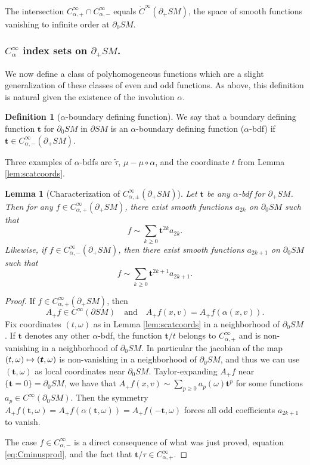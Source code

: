 \documentclass[11pt]{article}
\def\mto{\mathchoice{\longmapsto}{\mapsto}{\mapsto}{\mapsto}}
\theoremstyle{plain}
\newtheorem{Lemma}[Theorem]{Lemma}
\theoremstyle{definition}
\newtheorem{Definition}[Theorem]{Definition}
\theoremstyle{remark}
\def\t{\tilde{\tau}}
\newcommand{\bt}{{\boldsymbol{t}}}
\newcommand{\del}{\partial}
\begin{document}
The intersection $C_{\alpha,+}^\infty\cap C_{\alpha,-}^\infty$ equals $\dot C^\infty(\partial_+ SM)$, the space of
smooth functions vanishing to infinite order at $\partial_0 SM$.

\subsubsection*{$C_\alpha^\infty$ index sets on $\partial_+ SM$.} We now define a class of polyhomogeneous functions which are a slight generalization of these classes of even and odd functions. As above, this definition is natural given the existence of the involution $\alpha$.

\begin{Definition}[$\alpha$-boundary defining function]
We say that a boundary defining function $\bt$ for $\del_0 SM$ in $\del SM$ is an $\alpha$-boundary defining function ($\alpha$-bdf) if $\bt\in C_{\alpha,-}^\infty(\del_+ SM)$.
\end{Definition}
Three examples of $\alpha$-bdfs are $\t$, $\mu - \mu \circ \alpha$, and the coordinate $t$ from Lemma \ref{lem:scatcoords}.

\begin{Lemma}[Characterization of $C_{\alpha,\pm}^\infty(\partial_+ SM)$]\label{lem:bdfexpansion}
Let $\bt$ be any $\alpha$-bdf for $\partial_+ SM$. Then for any $f\in C^\infty_{\alpha,+} (\partial_+ SM)$, there exist smooth functions $a_{2k}$ on $\partial_0 SM$ such that
\begin{equation*}
f \sim \sum_{k\ge 0} \bt^{2k} a_{2k}.
\end{equation*}
Likewise, if $f\in C^\infty_{\alpha,-} (\partial_+ SM)$, then there exist smooth functions $a_{2k+1}$ on $\partial_0 SM$ such that
\begin{equation*}
f \sim \sum_{k\ge 0} \bt^{2k+1} a_{2k+1}.
\end{equation*}
\end{Lemma}
\begin{proof}
If $f\in C_{\alpha,+}^\infty(\partial_+ SM)$, then
\[
A_+ f\in C^\infty(\partial SM)\quad\text{and}\quad A_+ f(x,v) = A_+ f(\alpha(x,v)).
\]
Fix coordinates $(t,\omega)$ as in Lemma \ref{lem:scatcoords} in a neighborhood of $\partial_0 SM$. If $\bt$ denotes any other $\alpha$-bdf, the function $\bt/t$ belongs to $C_{\alpha,+}^\infty$ and is non-vanishing in a neighborhood of $\partial_0 SM$. In particular the jacobian of the map $(t,\omega)\mto (\bt,\omega)$ is non-vanishing in a neighborhood of $\partial_0 SM$, and thus we can use $(\bt,\omega)$ as local coordinates near $\partial_0 SM$. Taylor-expanding $A_+ f$ near $\{ \bt =0 \} = \partial_0 SM$, we have that $A_+ f(x,v) \sim \sum_{p\ge 0} a_p(\omega) \bt^p$ for some functions $a_p\in C^\infty(\partial_0 SM)$. Then the symmetry $A_+ f(\bt,\omega) = A_+ f(\alpha(\bt,\omega)) = A_+ f (-\bt,\omega)$ forces all odd coefficients $a_{2k+1}$ to vanish.

The case $f\in C_{\alpha,-}^\infty$ is a direct consequence of what was just proved, equation \eqref{eq:Cminusprod}, and the fact that $\bt/\tau\in C^{\infty}_{\alpha,+}$.
\end{proof}
\end{document}
